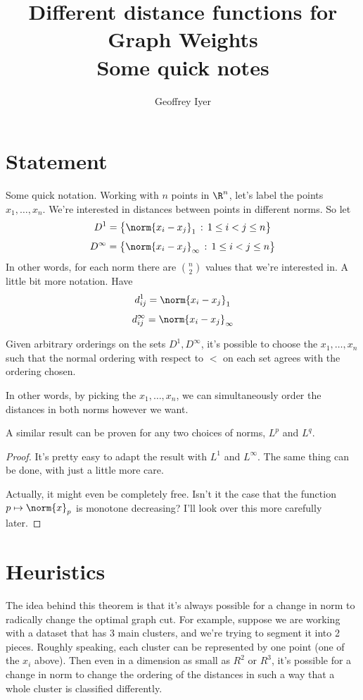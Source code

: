 \documentclass{article}[11pt]
\title{Different distance functions for Graph Weights\\Some quick notes}
\author{Geoffrey Iyer}
\begin{document}
\maketitle

\section{Statement}

Some quick notation. Working with $n$ points in $\R^n$, let's label the points $x_1,\ldots,x_n$. We're interested in distances between points in different norms. So let
\[D^1 = \left\{\norm{x_i - x_j}_1 \,:\, 1\leq i < j \leq n\right\}\]
\[D^\infty = \left\{\norm{x_i - x_j}_\infty \,:\, 1\leq i < j \leq n\right\}\]
In other words, for each norm there are $n \choose 2$ values that we're interested in. A little bit more notation. Have
\[d_{ij}^1 = \norm{x_i - x_j}_1\]
\[d_{ij}^\infty = \norm{x_i - x_j}_\infty\]
\begin{theorem} Given arbitrary orderings on the sets $D^1,D^\infty$, it's possible to choose the $x_1,\ldots,x_n$ such that the normal ordering with respect to $<$ on each set agrees with the ordering chosen.

  In other words, by picking the $x_1,\ldots,x_n$, we can simultaneously order the distances in both norms however we want.
\end{theorem}

\begin{cor} A similar result can be proven for any two choices of norms, $L^p$ and $L^q$.
\end{cor}
\begin{proof}
  It's pretty easy to adapt the result with $L^1$ and $L^\infty$. The same thing can be done, with just a little more care.

  Actually, it might even be completely free. Isn't it the case that the function $p \mapsto \norm{x}_p$ is monotone decreasing? I'll look over this more carefully later.
\end{proof}

\section{Heuristics}

The idea behind this theorem is that it's always possible for a change in norm to radically change the optimal graph cut. For example, suppose we are working with a dataset that has 3 main clusters, and we're trying to segment it into 2 pieces. Roughly speaking, each cluster can be represented by one point (one of the $x_i$ above). Then even in a dimension as small as $R^2$ or $R^3$, it's possible for a change in norm to change the ordering of the distances in such a way that a whole cluster is classified differently.
\end{document}
